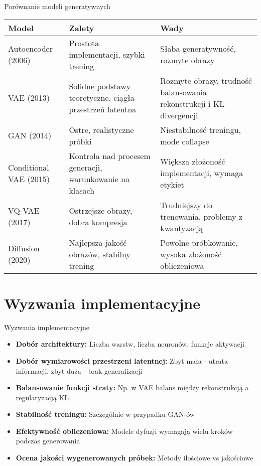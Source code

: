 \documentclass{beamer}
\begin{document}
\begin{frame}{Porównanie modeli generatywnych}
  \begin{tabular}{|p{2.5cm}|p{3.5cm}|p{3.5cm}|}
    \hline
    \textbf{Model} & \textbf{Zalety} & \textbf{Wady} \\
    \hline
    Autoencoder (2006) & Prostota implementacji, szybki trening & Słaba generatywność, rozmyte obrazy \\
    \hline
    VAE (2013) & Solidne podstawy teoretyczne, ciągła przestrzeń latentna & Rozmyte obrazy, trudność balansowania rekonstrukcji i KL divergencji \\
    \hline
    GAN (2014) & Ostre, realistyczne próbki & Niestabilność treningu, mode collapse \\
    \hline
    Conditional VAE (2015) & Kontrola nad procesem generacji, warunkowanie na klasach & Większa złożoność implementacji, wymaga etykiet \\
    \hline
    VQ-VAE (2017) & Ostrzejsze obrazy, dobra kompresja & Trudniejszy do trenowania, problemy z kwantyzacją \\
    \hline
    Diffusion (2020) & Najlepsza jakość obrazów, stabilny trening & Powolne próbkowanie, wysoka złożoność obliczeniowa \\
    \hline
  \end{tabular}
\end{frame}


\section{Wyzwania implementacyjne}

\begin{frame}{Wyzwania implementacyjne}
  \begin{itemize}
    \item \textbf{Dobór architektury:} Liczba warstw, liczba neuronów, funkcje aktywacji
    \item \textbf{Dobór wymiarowości przestrzeni latentnej:} Zbyt mała - utrata informacji, zbyt duża - brak generalizacji
    \item \textbf{Balansowanie funkcji straty:} Np. w VAE balans między rekonstrukcją a regularyzacją KL
    \item \textbf{Stabilność treningu:} Szczególnie w przypadku GAN-ów
    \item \textbf{Efektywność obliczeniowa:} Modele dyfuzji wymagają wielu kroków podczas generowania
    \item \textbf{Ocena jakości wygenerowanych próbek:} Metody ilościowe vs jakościowe
  \end{itemize}
\end{frame}
\end{document}
